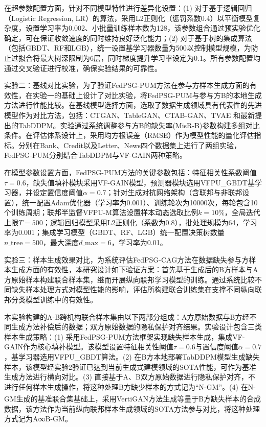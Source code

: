 在超参数配置方面，针对不同模型特性进行差异化设置：(1) 对于基于逻辑回归（Logistic Regression, LR）的算法，采用L2正则化（惩罚系数0.4）以平衡模型复杂度，设置学习率为0.002、小批量训练样本数为128，该参数组合通过预实验优化确定，可在保证收敛速度的同时维持良好泛化能力；(2) 对于基于树的集成算法（包括GBDT、RF和LGB），统一设置基学习器数量为500以控制模型规模，为防止过拟合将最大树深限制为6层，同时梯度提升学习率设定为0.1。所有参数配置均通过交叉验证进行校准，确保实验结果的可靠性。

实验二：基线对比实验，为了验证FedPSG-PUM方法在参与方样本生成方面的有效性，在实验一的基础上设计了对比实验，将FedPSG-PUM与参与方B的本地生成方法进行性能比较。在基线模型选择方面，选取了数据生成领域具有代表性的先进模型作为对比方法，包括：CTGAN、TableGAN、CTAB-GAN、TVAE 和最新提出的TabDDPM。实验通过系统调整参与方B的缺失率(MisR-B)参数构建多组对比条件。在评估体系设计上，采用均方根误差（RMSE）作为模型性能的量化评估指标。分别在Bank、Credit以及Letter、News四个数据集上进行了两组实验，FedPSG-PUM分别结合TabDDPM与VF-GAIN两种策略。

在模型参数设置方面，FedPSG-PUM方法的关键参数包括：特征相关性系数阈值$\tau=0.6$，缺失值填补模块采用VF-GAIN模型，预测器模块选用VFPU\_GBDT基学习器，并设定置信度阈值$\alpha=0.7$；针对生成对抗网络架构（含联邦与非联邦设置），统一配置Adam优化器（学习率为0.001）、训练轮次为10000次，每轮包含10个训练周期；联邦半监督VFPU-M算法设置样本动态选取比例$k=10\%$，全局迭代上限$T=500$；逻辑回归模型采用L2正则化（系数为0.8），批处理规模为64，学习率为0.001；集成学习模型（GBDT、RF、LGB）统一配置决策树数量$n\_{\text{tree}}=500$，最大深度$d\_{\text{max}}=6$，学习率为0.01。

实验三：样本生成效果对比，为系统评估FedPSG-CAG方法在数据缺失参与方样本生成方面的有效性，本研究设计如下验证方案：首先基于生成后的B方样本与A方原始样本构建联合样本集，继而开展纵向联邦学习模型的训练。通过系统比较不同缺失样本处理方式对模型性能的影响，评估所构建联合训练集在支撑不同纵向联邦分类模型训练中的有效性。

本实验构建的A-B跨机构联合样本集由以下两部分组成：A方原始数据与B方经不同生成方法补偿后的数据；双方原始数据的隐私保护对齐结果。实验设计包含三类样本生成策略：(1) 采用FedPSG-PUM方法框架实现缺失样本生成，集成VF-GAIN作为核心填补模型。该模型设置特征相关性阈值$\tau=0.6$与置信度阈值$\alpha=0.7$，基学习器选用VFPU\_GBDT算法。(2) 在B方本地部署TabDDPM模型生成缺失样本，该模型经实验2验证已达到当前生成式建模领域的SOTA性能，可作为基准生成方法进行横向对比。(3) 直接基于A、B双方原始数据进行隐私保护对齐，不进行任何样本生成操作，将这种处理B方缺少样本的方式记为“N-GM”。(4) 在N-GM生成的基准联合集基础上，采用VertiGAN\textsuperscript{\cite{VertiGAN}}方法生成等量于B方缺失样本的合成数据，该方法作为当前纵向联邦样本生成领域的SOTA方法参与对比，将这种处理方式记为A∞B-GM。


